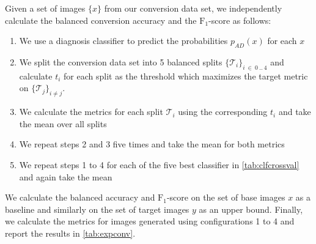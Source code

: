 Given a set of images $\{x\}$ from our conversion data set, we independently calculate the balanced conversion accuracy and the $\text{F}_1$-score as follows:
\begin{enumerate}
	\item We use a diagnosis classifier to predict the probabilities $p_{AD}(x)$ for each $x$
	\item We split the conversion data set into 5 balanced splits $\{\mathcal{T}_i\}_{i\ \in\ 0\ ..\ 4}$ and calculate $t_i$ for each split as the threshold which maximizes the target metric on $\{\mathcal{T}_j\}_{i \neq j}$.
	\item We calculate the metrics for each split $\mathcal{T}_i$ using the corresponding $t_i$ and take the mean over all splits
	\item We repeat steps 2 and 3 five times and take the mean for both metrics
	\item We repeat steps 1 to 4 for each of the five best classifier in \autoref{tab:clfcrossval} and again take the mean
\end{enumerate}

We calculate the balanced accuracy and $\text{F}_1$-score on the set of base images $x$ as a baseline and similarly on the set of target images $y$ as an upper bound. Finally, we calculate the metrics for images generated using configurations 1 to 4 and report the results in \autoref{tab:expconv}.

